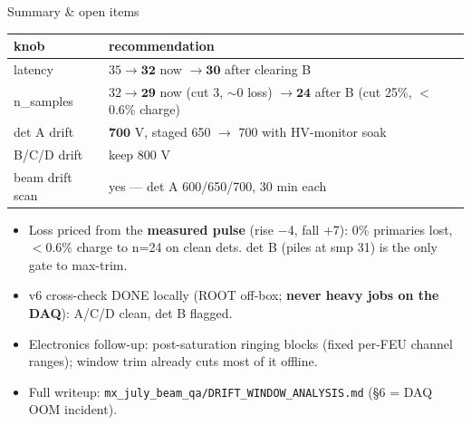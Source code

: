 \documentclass[10pt,aspectratio=169]{beamer}
\newcommand{\good}[1]{\textcolor{okgreen}{#1}}
\newcommand{\bad}[1]{\textcolor{okred}{#1}}
\begin{document}
\begin{frame}{Summary \& open items}
  \centering
  \begin{tabular}{ll}
    \toprule
    \textbf{knob} & \textbf{recommendation} \\
    \midrule
    latency & $35 \to \mathbf{32}$ now $\to \mathbf{30}$ after clearing B \\
    n\_samples & $32 \to \mathbf{29}$ now (cut 3, $\sim$0 loss) $\to \mathbf{24}$ after B (cut 25\%, $<$0.6\% charge) \\
    det A drift & $\mathbf{700}$ V, staged 650 $\to$ 700 with HV-monitor soak \\
    B/C/D drift & keep 800 V \\
    beam drift scan & yes --- det A 600/650/700, 30 min each \\
    \bottomrule
  \end{tabular}
  \vspace{0.8em}
  \begin{itemize}\small
    \item Loss priced from the \textbf{measured pulse} (rise $-$4, fall $+$7): 0\% primaries lost, $<$0.6\% charge to n=24 on clean dets. \bad{det B} (piles at smp 31) is the only gate to max-trim.
    \item v6 cross-check \good{DONE} locally (ROOT off-box; \textbf{never heavy jobs on the DAQ}): A/C/D clean, \bad{det B flagged}.
    \item Electronics follow-up: post-saturation ringing blocks (fixed per-FEU channel ranges); window trim already cuts most of it offline.
    \item Full writeup: \texttt{mx\_july\_beam\_qa/DRIFT\_WINDOW\_ANALYSIS.md} (\S6 = DAQ OOM incident).
  \end{itemize}
\end{frame}
\end{document}
